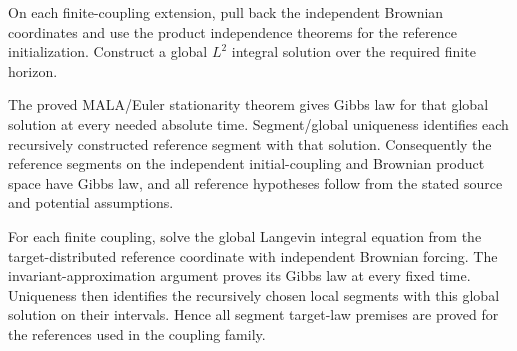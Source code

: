 \documentclass[11pt,a4paper]{article}
\begin{document}
On each finite-coupling extension, pull back the independent Brownian coordinates and use the product independence theorems for the reference initialization. Construct a global \(L^2\) integral solution over the required finite horizon.



The proved MALA/\allowbreak{}Euler stationarity theorem gives Gibbs law for that global solution at every needed absolute time. Segment/\allowbreak{}global uniqueness identifies each recursively constructed reference segment with that solution. Consequently the reference segments on the independent initial-coupling and Brownian product space have Gibbs law, and all reference hypotheses follow from the stated source and potential assumptions.



For each finite coupling, solve the global Langevin integral equation from the target-distributed reference coordinate with independent Brownian forcing. The invariant-approximation argument proves its Gibbs law at every fixed time. Uniqueness then identifies the recursively chosen local segments with this global solution on their intervals. Hence all segment target-law premises are proved for the references used in the coupling family.
\end{document}
